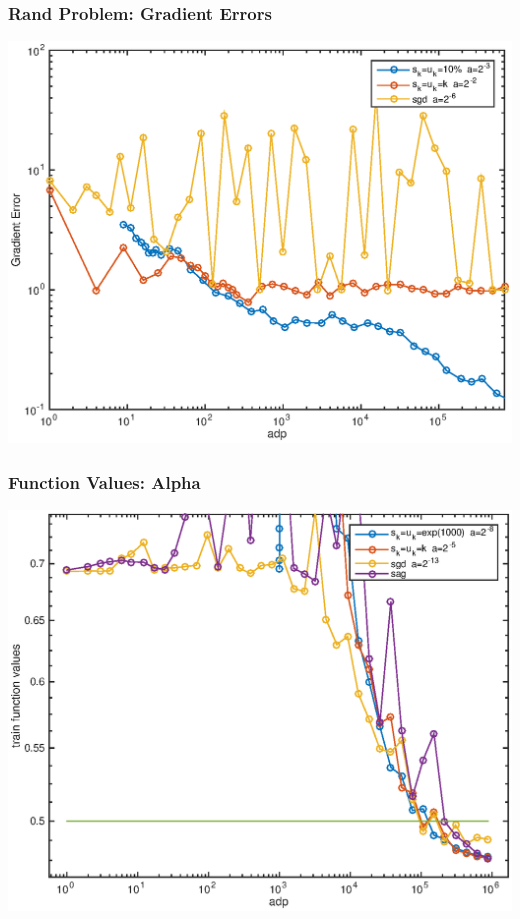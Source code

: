 \documentclass{beamer}
\begin{document}
		\begin{frame}
			\frametitle{Rand Problem: Gradient Errors}
			\begin{center}
					\includegraphics[scale=0.5]{rand-results-gerror.eps}
			\end{center}
     	\end{frame}

\begin{frame}
	\frametitle{Function Values: Alpha}
	\begin{center}
			\includegraphics[scale=0.5]{alpha-results-fvals.eps}
	\end{center}
\end{frame}
\end{document}
